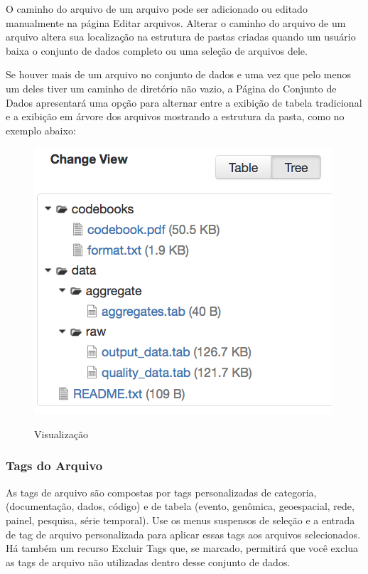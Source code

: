 \documentclass[12pt,hidelinks]{article}
\begin{document}
O caminho do arquivo de um arquivo pode ser adicionado ou editado manualmente na página Editar arquivos. Alterar o caminho do arquivo de um arquivo altera sua localização na estrutura de pastas criadas quando um usuário baixa o conjunto de dados completo ou uma seleção de arquivos dele.

Se houver mais de um arquivo no conjunto de dados e uma vez que pelo menos um deles tiver um caminho de diretório não vazio, a Página do Conjunto de Dados apresentará uma opção para alternar entre a exibição de tabela tradicional e a exibição em árvore dos arquivos mostrando a estrutura da pasta, como no exemplo abaixo:

\begin{figure}[H]
             \caption{Visualização}
                \centering
         \includegraphics[scale=0.5]{imagens/cam.png}
            \label{Caminho}
        \end{figure}
  
        \subsubsection{Tags do Arquivo}
        
\qquad As tags de arquivo são compostas por tags personalizadas de categoria, (documentação, dados, código) e de tabela (evento, genômica, geoespacial, rede, painel, pesquisa, série temporal). Use os menus suspensos de seleção e a entrada de tag de arquivo personalizada para aplicar essas tags aos arquivos selecionados. Há também um recurso Excluir Tags que, se marcado, permitirá que você exclua as tags de arquivo não utilizadas dentro desse conjunto de dados.
        
\end{document}
